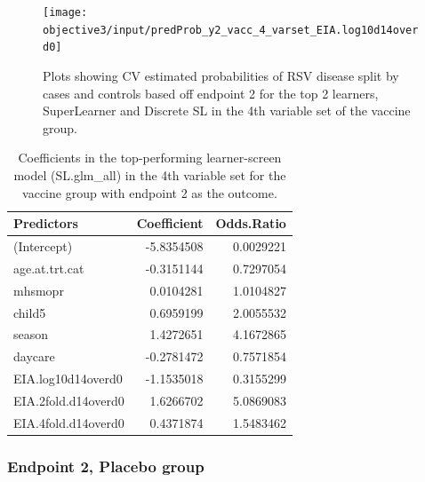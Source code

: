 \documentclass[11pt]{article}
\begin{document}
\begin{figure}[H]
    \centering
    \texttt{[image: objective3/input/predProb\_y2\_vacc\_4\_varset\_EIA.log10d14overd0]}
    \caption{Plots showing CV estimated probabilities of RSV disease split by cases and controls based off endpoint 2 for the top 2 learners, SuperLearner and Discrete SL in the 4th variable set of the vaccine group.}
    \label{fig:predProb_y2_vacc_chosenvarset}
    \end{figure}

\begin{table}[!h]

\caption{\label{tab:coefy2vacc4varsetEIAlogd14overd0}Coefficients in the top-performing learner-screen model (SL.glm\_all) in the 4th variable set for the vaccine group with endpoint 2 as the outcome.}
\centering
\fontsize{10}{12}\selectfont
\begin{tabular}[t]{lrr}
\toprule
Predictors & Coefficient & Odds.Ratio\\
\midrule
(Intercept) & -5.8354508 & 0.0029221\\
age.at.trt.cat & -0.3151144 & 0.7297054\\
mhsmopr & 0.0104281 & 1.0104827\\
child5 & 0.6959199 & 2.0055532\\
season & 1.4272651 & 4.1672865\\
daycare & -0.2781472 & 0.7571854\\
EIA.log10d14overd0 & -1.1535018 & 0.3155299\\
EIA.2fold.d14overd0 & 1.6266702 & 5.0869083\\
EIA.4fold.d14overd0 & 0.4371874 & 1.5483462\\
\bottomrule
\end{tabular}
\end{table}

\clearpage

\hypertarget{endpoint-2-placebo-group}{%
\subsubsection{Endpoint 2, Placebo group}\label{endpoint-2-placebo-group}}
\end{document}
